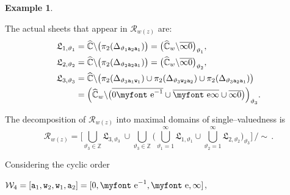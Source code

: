 \documentclass[final,3p,times]{elsarticle}
\newcommand{\ZZ}{\ensuremath{{\mathbb Z}}}
\newcommand{\CW}{\ensuremath{{\widehat{\mathbb C}}}}
\newcommand{\R}{\ensuremath{{\mathcal R}}}
\newcommand{\e}{{\text{\myfont e}}}
\theoremstyle{definition}
\newtheorem{example}{Example}[section]
\begin{document}
\begin{example}
\begin{enumerate}[label=\alph*),leftmargin=*]
\noindent
The actual sheets that appear in $\R_{w(z)}$ are:
\begin{align*}
\mathfrak{L}_{1,\vartheta_1} &= \CW\backslash \big( \pi_2 (\Delta_{\vartheta_1 {\tt a}_2 {\tt a}_1}  ) \big)
= \big( \CW_w \backslash  \overline{\infty 0} \big)_{\vartheta_1},
\\
%
\mathfrak{L}_{2,\vartheta_2} &= \CW\backslash \big( \pi_2 (\Delta_{\vartheta_2 {\tt a}_2 {\tt a}_1} ) \big)
= \big( \CW_w \backslash  \overline{\infty 0} \big)_{\vartheta_2},
\\
%
\mathfrak{L}_{3,\vartheta_3} &= \CW\backslash \big( 
\pi_2 (\Delta_{\vartheta_3 {\tt a}_1 {\tt w}_1} ) \cup 
\pi_2 (\Delta_{\vartheta_3 {\tt w}_2 {\tt a}_2} ) \cup
\pi_2 (\Delta_{\vartheta_3 {\tt a}_2 {\tt a}_1} ) 
\big)
\\
&= \Big( \CW_w \backslash  \big(
\overline{0 \e^{-1} } \cup
\overline{\e \infty } \cup
\overline{\infty 0 } 
\big)
\Big)_{\vartheta_3}.
\end{align*}

\noindent
The decomposition of $\R_{w(z)}$ into maximal domains of single--valuedness is
\begin{equation*}
\R_{w(z)} = 
\Bigg[
\bigcup_{\vartheta_3 \in\ZZ}
\mathfrak{L}_{3,\vartheta_3}
\ \cup
\bigcup_{\vartheta_3 \in\ZZ}
\bigg(
\bigcup_{\vartheta_1= 1}^\infty 
\mathfrak{L}_{1, \vartheta_1}
\cup
\bigcup_{\vartheta_2= 1}^\infty 
\mathfrak{L}_{2, \vartheta_2 }
\bigg)_{\vartheta_3}
\Bigg]
\, \Big/ \sim \, .
\end{equation*}


Considering the cyclic order 

\centerline{
$\mathcal{W}_4=[{\tt a}_1, {\tt w}_2, {\tt w}_1, {\tt a}_2]=[0, \e^{-1},\e,\infty ]$,}


\end{enumerate}
\end{example}
\end{document}
